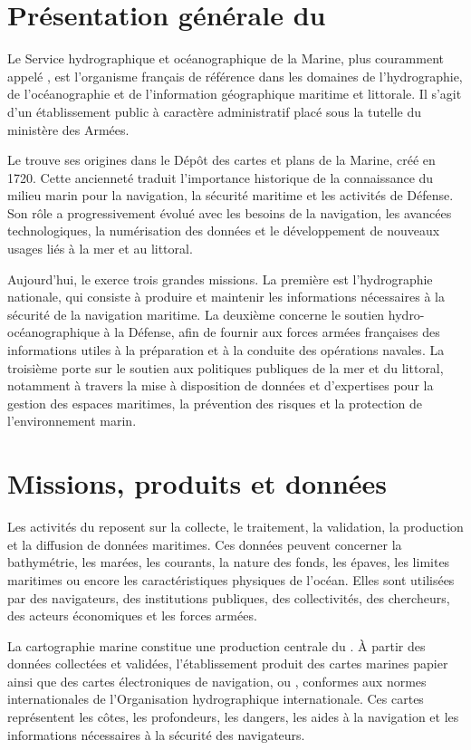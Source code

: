 \section{Présentation générale du }

Le Service hydrographique et océanographique de la Marine, plus couramment appelé , est l'organisme français de référence dans les domaines de l'hydrographie, de l'océanographie et de l'information géographique maritime et littorale. Il s'agit d'un établissement public à caractère administratif placé sous la tutelle du ministère des Armées.

Le  trouve ses origines dans le Dépôt des cartes et plans de la Marine, créé en 1720. Cette ancienneté traduit l'importance historique de la connaissance du milieu marin pour la navigation, la sécurité maritime et les activités de Défense. Son rôle a progressivement évolué avec les besoins de la navigation, les avancées technologiques, la numérisation des données et le développement de nouveaux usages liés à la mer et au littoral.

Aujourd'hui, le  exerce trois grandes missions. La première est l'hydrographie nationale, qui consiste à produire et maintenir les informations nécessaires à la sécurité de la navigation maritime. La deuxième concerne le soutien hydro-océanographique à la Défense, afin de fournir aux forces armées françaises des informations utiles à la préparation et à la conduite des opérations navales. La troisième porte sur le soutien aux politiques publiques de la mer et du littoral, notamment à travers la mise à disposition de données et d'expertises pour la gestion des espaces maritimes, la prévention des risques et la protection de l'environnement marin.

\section{Missions, produits et données}

Les activités du  reposent sur la collecte, le traitement, la validation, la production et la diffusion de données maritimes. Ces données peuvent concerner la bathymétrie, les marées, les courants, la nature des fonds, les épaves, les limites maritimes ou encore les caractéristiques physiques de l'océan. Elles sont utilisées par des navigateurs, des institutions publiques, des collectivités, des chercheurs, des acteurs économiques et les forces armées.

La cartographie marine constitue une production centrale du . À partir des données collectées et validées, l'établissement produit des cartes marines papier ainsi que des cartes électroniques de navigation, ou , conformes aux normes internationales de l'Organisation hydrographique internationale. Ces cartes représentent les côtes, les profondeurs, les dangers, les aides à la navigation et les informations nécessaires à la sécurité des navigateurs.

